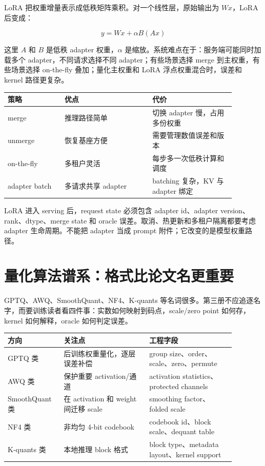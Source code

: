LoRA 把权重增量表示成低秩矩阵乘积。对一个线性层，原始输出为 \(Wx\)，LoRA 后变成：

\[
  y = Wx + \alpha B(Ax)
\]

这里 \(A\) 和 \(B\) 是低秩 adapter 权重，\(\alpha\) 是缩放。系统难点在于：服务端可能同时加载多个 adapter，不同请求选择不同 adapter；有些场景选择 merge 到主权重，有些场景选择 on-the-fly 叠加；量化主权重和 LoRA 浮点权重混合时，误差和 kernel 路径更复杂。

\begin{center}
\small
\begin{tabular}{p{0.22\linewidth}p{0.34\linewidth}p{0.32\linewidth}}
\toprule
策略 & 优点 & 代价 \\
\midrule
merge & 推理路径简单 & 切换 adapter 慢，占用多份权重 \\
unmerge & 恢复基座方便 & 需要管理数值误差和版本 \\
on-the-fly & 多租户灵活 & 每步多一次低秩计算和调度 \\
adapter batch & 多请求共享 adapter & batching 复杂，KV 与 adapter 绑定 \\
\bottomrule
\end{tabular}
\end{center}

LoRA 进入 serving 后，request state 必须包含 adapter id、adapter version、rank、dtype、merge state 和 oracle 误差。取消、热更新和多租户隔离都要考虑 adapter 生命周期。不能把 adapter 当成 prompt 附件；它改变的是模型权重路径。

\section{量化算法谱系：格式比论文名更重要}

GPTQ、AWQ、SmoothQuant、NF4、K-quants 等名词很多。第三册不应追逐名字，而要训练读者看四件事：实数如何映射到码点，scale/zero point 如何存，kernel 如何解释，oracle 如何判定误差。

\begin{center}
\small
\begin{tabular}{p{0.20\linewidth}p{0.34\linewidth}p{0.34\linewidth}}
\toprule
方向 & 关注点 & 工程字段 \\
\midrule
GPTQ 类 & 后训练权重量化，逐层误差补偿 & group size、order、scale、zero、permute \\
AWQ 类 & 保护重要 activation/通道 & activation statistics、protected channels \\
SmoothQuant 类 & 在 activation 和 weight 间迁移 scale & smoothing factor、folded scale \\
NF4 类 & 非均匀 4-bit codebook & codebook id、block scale、dequant table \\
K-quants 类 & 本地推理 block 格式 & block type、metadata layout、kernel support \\
\bottomrule
\end{tabular}
\end{center}

